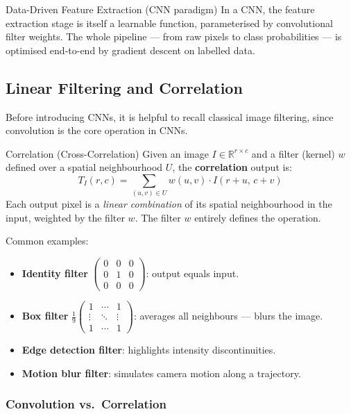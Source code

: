 \documentclass[11pt,a4paper]{article}
\newcommand{\term}[1]{\textcolor{DefGreen}{\textbf{#1}}}
\begin{document}
\begin{defbox}{Data-Driven Feature Extraction (CNN paradigm)}
In a CNN, the feature extraction stage is itself a learnable function, parameterised by convolutional filter weights. The whole pipeline — from raw pixels to class probabilities — is optimised end-to-end by gradient descent on labelled data.
\end{defbox}

\subsection{Linear Filtering and Correlation}
\label{sec:filtering}

Before introducing CNNs, it is helpful to recall classical image filtering, since convolution is the core operation in CNNs.

\begin{defbox}{Correlation (Cross-Correlation)}
Given an image $I \in \mathbb{R}^{r \times c}$ and a filter (kernel) $w$ defined over a spatial neighbourhood $U$, the \term{correlation} output is:
\[
T_I(r,c) = \sum_{(u,v)\in U} w(u,v)\cdot I(r+u,\, c+v)
\]
Each output pixel is a \emph{linear combination} of its spatial neighbourhood in the input, weighted by the filter $w$. The filter $w$ entirely defines the operation.
\end{defbox}

Common examples:
\begin{itemize}
  \item \textbf{Identity filter} $\begin{pmatrix}0&0&0\\0&1&0\\0&0&0\end{pmatrix}$: output equals input.
  \item \textbf{Box filter} $\frac{1}{9}\begin{pmatrix}1&\cdots&1\\\vdots&\ddots&\vdots\\1&\cdots&1\end{pmatrix}$: averages all neighbours — blurs the image.
  \item \textbf{Edge detection filter}: highlights intensity discontinuities.
  \item \textbf{Motion blur filter}: simulates camera motion along a trajectory.
\end{itemize}

\subsubsection{Convolution vs.\ Correlation}
\end{document}
